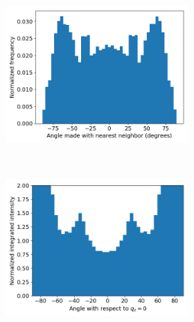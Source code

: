 \documentclass[journal=jpcbfk,manusciprt=article]{achemso}
\begin{document}
  \begin{figure}[!htb]
  \centering
	\begin{subfigure}{\linewidth}
	\centering
		\begin{subfigure}{0.45\textwidth}
	        \centering
		        \includegraphics[width=\linewidth]{angles_traj_layered.png}
		        \caption{}~\label{fig:layered_tails}
		\end{subfigure}
		\begin{subfigure}{0.45\textwidth}
        	\centering
		        \includegraphics[width=\linewidth]{layered_angle_v_I.png}
		        \caption{}~\label{fig:layered_integration}

\end{subfigure}
\end{subfigure}
\end{figure}
\end{document}
